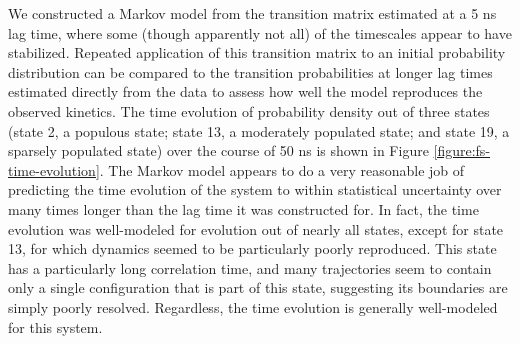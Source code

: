 We constructed a Markov model from the transition matrix estimated at a 5 ns lag time, where some (though apparently not all) of the timescales appear to have stabilized.
Repeated application of this transition matrix to an initial probability distribution can be compared to the transition probabilities at longer lag times estimated directly from the data to assess how well the model reproduces the observed kinetics.
The time evolution of probability density out of three states (state 2, a populous state; state 13, a moderately populated state; and state 19, a sparsely populated state) over the course of 50 ns is shown in Figure \ref{figure:fs-time-evolution}.
The Markov model appears to do a very reasonable job of predicting the time evolution of the system to within statistical uncertainty over many times longer than the lag time it was constructed for.
In fact, the time evolution was well-modeled for evolution out of nearly all states, except for state 13, for which dynamics seemed to be particularly poorly reproduced.
This state has a particularly long correlation time, and many trajectories seem to contain only a single configuration that is part of this state, suggesting its boundaries are simply poorly resolved.
Regardless, the time evolution is generally well-modeled for this system.




